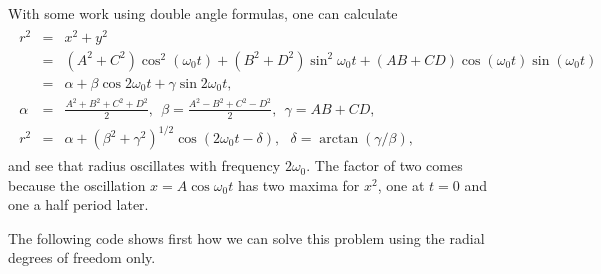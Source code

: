 \documentclass[letterpaper,10pt,english]{sphinxmanual}
\begin{document}
With some work using double angle formulas, one can calculate
\begin{equation*}
\begin{split}
\begin{eqnarray*}
r^2&=&x^2+y^2\\
\nonumber
&=&(A^2+C^2)\cos^2(\omega_0t)+(B^2+D^2)\sin^2\omega_0t+(AB+CD)\cos(\omega_0t)\sin(\omega_0t)\\
\nonumber
&=&\alpha+\beta\cos 2\omega_0 t+\gamma\sin 2\omega_0 t,\\
\alpha&=&\frac{A^2+B^2+C^2+D^2}{2},~~\beta=\frac{A^2-B^2+C^2-D^2}{2},~~\gamma=AB+CD,\\
r^2&=&\alpha+(\beta^2+\gamma^2)^{1/2}\cos(2\omega_0 t-\delta),~~~\delta=\arctan(\gamma/\beta),
\end{eqnarray*}
\end{split}
\end{equation*}
and see that radius oscillates with frequency \(2\omega_0\). The
factor of two comes because the oscillation \(x=A\cos\omega_0t\) has two
maxima for \(x^2\), one at \(t=0\) and one a half period later.

The following code shows first how we can solve this problem using the radial degrees of freedom only.
\end{document}
